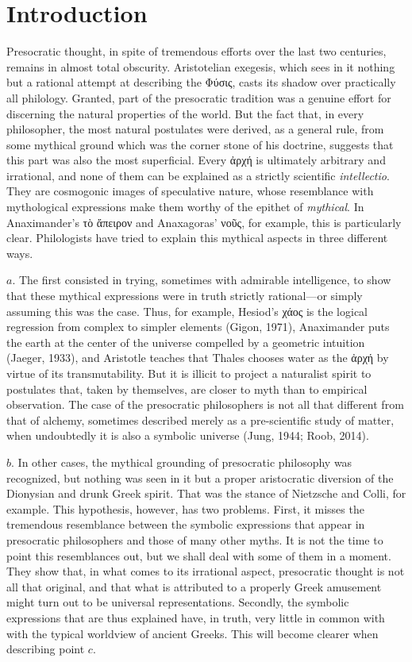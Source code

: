 \documentclass[a4paper]{article}
\begin{document}
\section{Introduction}

Presocratic thought, in spite of tremendous efforts over the last two centuries,
remains in almost total obscurity. Aristotelian exegesis, which sees in it
nothing but a rational attempt at describing the Φύσις, casts its shadow over
practically all philology. Granted, part of the presocratic tradition was a
genuine effort for discerning the natural properties of the world. But the fact
that, in every philosopher, the most natural postulates were derived, as a
general rule, from some mythical ground which was the corner stone of his
doctrine, suggests that this part was also the most superficial. Every ἀρχή is
ultimately arbitrary and irrational, and none of them can be explained as a
strictly scientific \textit{intellectio}. They are cosmogonic images of
speculative nature, whose resemblance with mythological expressions make them
worthy of the epithet of \textit{mythical}. In Anaximander's τὸ ἄπειρον and
Anaxagoras' νοῦς, for example, this is particularly clear. Philologists have
tried to explain this mythical aspects in three different ways.

$ a. $ The first consisted in trying, sometimes with admirable intelligence, to
show that these mythical expressions were in truth strictly rational---or simply
assuming this was the case. Thus, for example, Hesiod's χάος is the logical
regression from complex to simpler elements (Gigon, 1971), Anaximander puts the
earth at the center of the universe compelled by a geometric intuition (Jaeger,
1933), and Aristotle teaches that Thales chooses water as the ἀρχή by virtue of
its transmutability. But it is illicit to project a naturalist spirit to
postulates that, taken by themselves, are closer to myth than to empirical
observation. The case of the presocratic philosophers is not all that different
from that of alchemy, sometimes described merely as a pre-scientific study of
matter, when undoubtedly it is also a symbolic universe (Jung, 1944; Roob,
2014).

$ b. $ In other cases, the mythical grounding of presocratic philosophy was
recognized, but nothing was seen in it but a proper aristocratic diversion of
the Dionysian and drunk Greek spirit. That was the stance of Nietzsche and
Colli, for example. This hypothesis, however, has two problems. First, it misses
the tremendous resemblance between the symbolic expressions that appear in
presocratic philosophers and those of many other myths. It is not the time to
point this resemblances out, but we shall deal with some of them in a moment.
They show that, in what comes to its irrational aspect, presocratic thought is
not all that original, and that what is attributed to a properly Greek amusement
might turn out to be universal representations. Secondly, the symbolic
expressions that are thus explained have, in truth, very little in common with
with the typical worldview of ancient Greeks. This will become clearer when
describing point $ c. $ 
\end{document}

